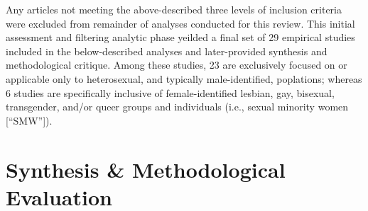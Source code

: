 \documentclass[11pt,]{tufte-book}
\begin{document}
Any articles not meeting the above-described three levels of inclusion
criteria were excluded from remainder of analyses conducted for this
review. This initial assessment and filtering analytic phase yeilded a
final set of 29 empirical studies included in the below-described
analyses and later-provided synthesis and methodological critique. Among
these studies, 23 are exclusively focused on or applicable only to
heterosexual, and typically male-identified, poplations; whereas 6
studies are specifically inclusive of female-identified lesbian, gay,
bisexual, transgender, and/or queer groups and individuals (i.e., sexual
minority women {[}``SMW''{]}).

\section{Synthesis \& Methodological
Evaluation}\label{synthesis-methodological-evaluation}
\end{document}
